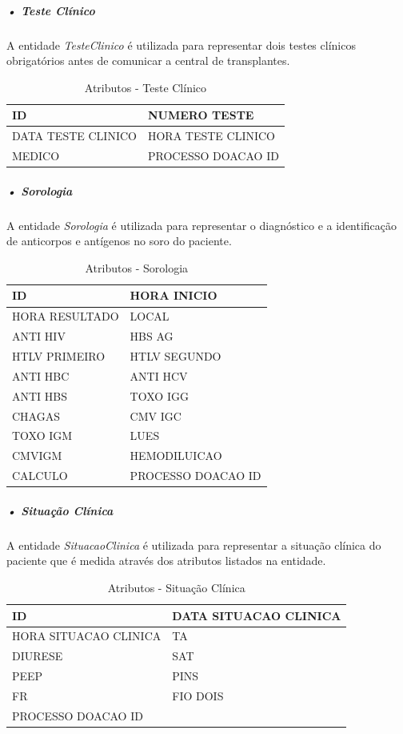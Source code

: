 \documentclass[portuguese,oneside]{tcc}
\begin{document}
\subparagraph{• Teste Clínico}
A entidade \textit{TesteClinico} é utilizada para representar dois testes clínicos obrigatórios antes de comunicar a central de transplantes.

\begin{table}
\centering
\caption{Atributos - Teste Clínico} \label{table:atr-teste-clinico}
\begin{tabular}{ |p{6cm}|p{6cm}| }

\hline
ID & NUMERO TESTE\\
\hline
DATA TESTE CLINICO & HORA TESTE CLINICO\\
\hline
MEDICO & PROCESSO DOACAO ID\\
\hline

\end{tabular}
\end{table}

\newpage

\subparagraph{• Sorologia}
A entidade \textit{Sorologia} é utilizada para representar o diagnóstico e a identificação de anticorpos e antígenos no soro do paciente.

\begin{table}
\centering
\caption{Atributos - Sorologia} \label{table:atr-sorologia}
\begin{tabular}{ |p{6cm}|p{6cm}| }

\hline
ID & HORA INICIO\\
\hline
HORA RESULTADO & LOCAL\\
\hline
ANTI HIV & HBS AG\\
\hline
HTLV PRIMEIRO & HTLV SEGUNDO \\
\hline
ANTI HBC & ANTI HCV\\
\hline
ANTI HBS & TOXO IGG\\
\hline
CHAGAS & CMV IGC\\
\hline
TOXO IGM & LUES\\
\hline
CMVIGM & HEMODILUICAO\\
\hline
CALCULO & PROCESSO DOACAO ID\\
\hline

\end{tabular}
\end{table}

\subparagraph{• Situação Clínica}
A entidade \textit{SituacaoClinica} é utilizada para representar a situação clínica do paciente que é medida através dos atributos listados na entidade.

\begin{table}
\centering
\caption{Atributos - Situação Clínica} \label{table:atr-situacao-clinica}
\begin{tabular}{ |p{6cm}|p{6cm}| }

\hline
ID &DATA SITUACAO CLINICA\\
\hline
HORA SITUACAO CLINICA & TA\\
\hline
DIURESE & SAT\\
\hline
PEEP & PINS \\
\hline
FR & FIO DOIS\\
\hline
PROCESSO DOACAO ID&\\
\hline

\end{tabular}
\end{table}
\end{document}
